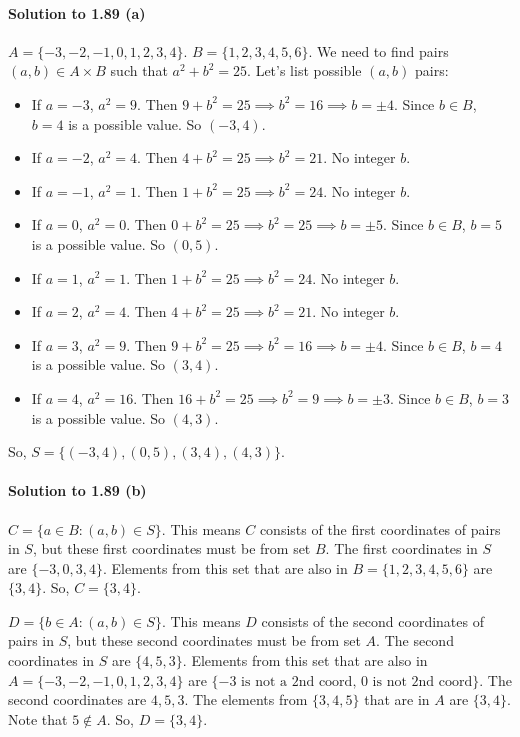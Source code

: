 \documentclass{article}
\begin{document}
\begin{itemize}
\begin{itemize}
\begin{itemize}
\paragraph*{Solution to 1.89 (a)}
$A = \{-3, -2, -1, 0, 1, 2, 3, 4\}$.
$B = \{1, 2, 3, 4, 5, 6\}$.
We need to find pairs $(a, b) \in A \times B$ such that $a^2 + b^2 = 25$.
Let's list possible $(a,b)$ pairs:
\begin{itemize}
    \item If $a = -3$, $a^2 = 9$. Then $9 + b^2 = 25 \implies b^2 = 16 \implies b = \pm 4$.
        Since $b \in B$, $b=4$ is a possible value. So $(-3, 4)$.
    \item If $a = -2$, $a^2 = 4$. Then $4 + b^2 = 25 \implies b^2 = 21$. No integer $b$.
    \item If $a = -1$, $a^2 = 1$. Then $1 + b^2 = 25 \implies b^2 = 24$. No integer $b$.
    \item If $a = 0$, $a^2 = 0$. Then $0 + b^2 = 25 \implies b^2 = 25 \implies b = \pm 5$.
        Since $b \in B$, $b=5$ is a possible value. So $(0, 5)$.
    \item If $a = 1$, $a^2 = 1$. Then $1 + b^2 = 25 \implies b^2 = 24$. No integer $b$.
    \item If $a = 2$, $a^2 = 4$. Then $4 + b^2 = 25 \implies b^2 = 21$. No integer $b$.
    \item If $a = 3$, $a^2 = 9$. Then $9 + b^2 = 25 \implies b^2 = 16 \implies b = \pm 4$.
        Since $b \in B$, $b=4$ is a possible value. So $(3, 4)$.
    \item If $a = 4$, $a^2 = 16$. Then $16 + b^2 = 25 \implies b^2 = 9 \implies b = \pm 3$.
        Since $b \in B$, $b=3$ is a possible value. So $(4, 3)$.
\end{itemize}
So, $S = \{(-3, 4), (0, 5), (3, 4), (4, 3)\}$.

\paragraph*{Solution to 1.89 (b)}
$C = \{a \in B : (a, b) \in S\}$.
This means $C$ consists of the first coordinates of pairs in $S$, but these first coordinates must be from set $B$.
The first coordinates in $S$ are $\{-3, 0, 3, 4\}$.
Elements from this set that are also in $B = \{1, 2, 3, 4, 5, 6\}$ are $\{3, 4\}$.
So, $C = \{3, 4\}$.

$D = \{b \in A : (a, b) \in S\}$.
This means $D$ consists of the second coordinates of pairs in $S$, but these second coordinates must be from set $A$.
The second coordinates in $S$ are $\{4, 5, 3\}$.
Elements from this set that are also in $A = \{-3, -2, -1, 0, 1, 2, 3, 4\}$ are $\{-3 \text{ is not a 2nd coord, } 0 \text{ is not 2nd coord}\}$. The second coordinates are $4, 5, 3$.
The elements from $\{3, 4, 5\}$ that are in $A$ are $\{3, 4\}$. Note that $5 \notin A$.
So, $D = \{3, 4\}$.


\end{itemize}
\end{itemize}
\end{itemize}
\end{document}

